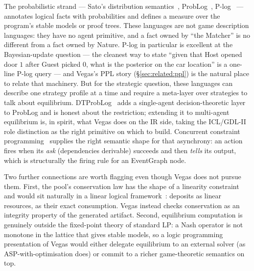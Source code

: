 The probabilistic strand --- Sato's distribution
semantics~\citep{Sato1995DistributionSemantics},
ProbLog~\citep{DeRaedt2007ProbLog},
P-log~\citep{BaralGelfondRushton2009PLog} --- annotates logical
facts with probabilities and defines a measure over the
program's stable models or proof trees.  These languages are
not game description languages: they have no agent primitive,
and a  fact owned by ``the Matcher'' is no
different from a  fact owned by Nature.
P-log in particular is excellent at the Bayesian-update
question --- the cleanest way to state ``given that Host opened
door $1$ after Guest picked $0$, what is the posterior on the
car location'' is a one-line P-log query --- and Vegas's PPL
story (\S\ref{sec:related:ppl}) is the natural place to relate
that machinery.  But for the strategic question, these
languages can describe one strategy profile at a time and
require a meta-layer over strategies to talk about equilibrium.
DTProbLog~\citep{VandenBroeck2010DTProbLog} adds a single-agent
decision-theoretic layer to ProbLog and is honest about the
restriction; extending it to multi-agent equilibrium is, in
spirit, what Vegas does on the IR side, taking the ICL/GDL-II
role distinction as the right primitive on which to build.  Concurrent constraint
programming~\citep{Saraswat1991CCP} supplies the right semantic
shape for that asynchrony: an action fires when its
\emph{ask} (dependencies derivable) succeeds and then
\emph{tells} its output, which is structurally the firing rule
for an EventGraph node.

Two further connections are worth flagging even though Vegas
does not pursue them.  First, the pool's conservation law has
the shape of a linearity constraint and would sit naturally in a
linear logical framework~\citep{CervesatoPfenning2002CLF,
LopezPfenningPolakow2005LolliMon}: deposits as linear resources,
 as their exact consumption.  Vegas instead checks
conservation as an integrity property of the generated artifact.
Second, equilibrium computation is genuinely outside the
fixed-point theory of standard LP: a Nash operator is not
monotone in the lattice that gives stable models, so a logic
programming presentation of Vegas would either delegate
equilibrium to an external solver (as ASP-with-optimisation
does) or commit to a richer game-theoretic semantics on top.

